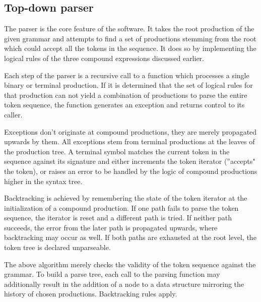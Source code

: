 \documentclass{article}
\begin{document}
	\subsection{Top-down parser}

	The parser is the core feature of the software. It takes the root production
	of the given grammar and attempts to find a set of productions stemming from
	the root which could accept all the tokens in the sequence. It does so by
	implementing the logical rules of the three compound expressions discussed
	earlier.

	Each step of the parser is a recursive call to a function which processes
	a single binary or terminal production. If it is determined that the set of
	logical rules for that production can not yield a combination of productions to
	parse the entire token sequence, the function generates an exception and returns
	control to its caller.

	Exceptions don't originate at compound productions, they are merely propagated
	upwards by them. All exceptions stem from terminal productions at the leaves
	of the production tree. A terminal symbol matches the current token in the
	sequence against its signature and either increments the token iterator
	(''accepts" the token), or raises an error to be handled by the logic of
	compound productions higher in the syntax tree.

	Backtracking is achieved by remembering the state of the token iterator at
	the initialization of a compound production. If one path fails to parse
	the token sequence, the iterator is reset and a different path is tried.
	If neither path succeeds, the error from the later path is propagated
	upwards, where backtracking may occur as well. If both paths are exhausted
	at the root level, the token tree is declared unparseable.

	The above algorithm merely checks the validity of the token sequence against
	the grammar. To build a parse tree, each call to the parsing function may
	additionally result in the addition of a node to a data structure mirroring
	the history of chosen productions. Backtracking rules apply.
\end{document}

